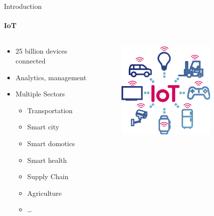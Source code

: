 \begin{frame}{Introduction}
\framesubtitle{IoT}
\begin{columns}
\begin{column}{0.6\textwidth}
\begin{itemize}
  \item 25 billion devices connected
  \item Analytics, management
  \item Multiple Sectors
  \begin{itemize}
    \item Transportation
    \item Smart city
    \item Smart domotics
    \item Smart health
    \item Supply Chain
    \item Agriculture
    \item \ldots
  \end{itemize}
\end{itemize}
\end{column}
\begin{column}{0.4\textwidth}
\begin{figure}
\includegraphics[width=0.8\textwidth]{presentation.tex/fig/iot.png}
\end{figure}
\end{column}
\end{columns}
\end{frame}

